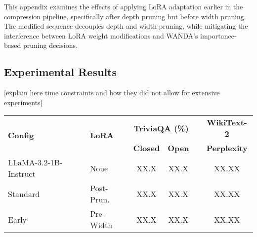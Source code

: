 This appendix examines the effects of applying LoRA adaptation earlier in the compression pipeline, specifically after depth pruning but before width pruning. The modified sequence decouples depth and width pruning, while mitigating the interference between LoRA weight modifications and WANDA's importance-based pruning decisions.

\subsection{Experimental Results}
[explain here time constraints and how they did not allow for extensive experiments]

\begin{center}
\label{tab:lora_positioning}
\small
\begin{tabular}{llcccc}
\hline
\multirow{2}{*}{\textbf{Config}} & \multirow{2}{*}{\textbf{LoRA}} & \multicolumn{2}{c}{\textbf{TriviaQA (\%)}} & & \textbf{WikiText-2} \\
\cline{3-4}
& & \textbf{Closed} & \textbf{Open} & & \textbf{Perplexity} \\
\hline
LLaMA-3.2-1B-Instruct & None & XX.X & XX.X & & XX.XX \\
Standard & Post-Prun. & XX.X & XX.X & & XX.XX \\
Early & Pre-Width & XX.X & XX.X & & XX.XX \\
\hline
\end{tabular}
\end{center}
